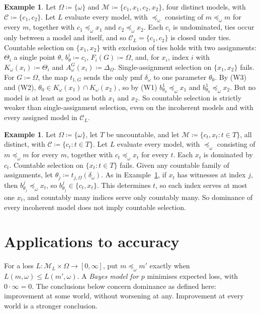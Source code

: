\documentclass[11pt]{article}
\theoremstyle{definition}
\newtheorem{example}[theorem]{Example}
\theoremstyle{remark}
\newcommand{\M}{\mathcal M}
\newcommand{\C}{\mathcal C}
\begin{document}
\begin{example}\label{ex:two-pairs}
Let $\Omega\coloneqq\{\omega\}$ and $\M\coloneqq\{c_1,x_1,c_2,x_2\}$, four distinct models, with $\C\coloneqq\{c_1,c_2\}$. Let $L$ evaluate every model, with $\preceq_\omega$ consisting of $m\preceq_\omega m$ for every $m$, together with $c_1\preceq_\omega x_1$ and $c_2\preceq_\omega x_2$. Each $c_i$ is undominated, ties occur only between a model and itself, and so $\C_L=\{c_1,c_2\}$ is closed under ties. Countable selection on $\{x_1,x_2\}$ with exclusion of ties holds with two assignments: $\Theta_i$ a single point $\theta$, $b^i_\theta\coloneqq c_i$, $F_i(G)\coloneqq\Omega$, and, for $x_i$, index $i$ with $K_\omega(x_i)\coloneqq\Theta_i$ and $A^G_\omega(x_i)\coloneqq\Delta_\Omega$. Single-assignment selection on $\{x_1,x_2\}$ fails. For $G\coloneqq\Omega$, the map $t_{1,G}$ sends the only pmf $\delta_\omega$ to one parameter $\theta_0$. By (W3) and (W2), $\theta_0\in K_\omega(x_1)\cap K_\omega(x_2)$, so by (W1) $b^1_{\theta_0}\preceq_\omega x_1$ and $b^1_{\theta_0}\preceq_\omega x_2$. But no model is at least as good as both $x_1$ and $x_2$. So countable selection is strictly weaker than single-assignment selection, even on the incoherent models and with every assigned model in $\C_L$.
\end{example}

\begin{example}\label{ex:uncountable}
Let $\Omega\coloneqq\{\omega\}$, let $T$ be uncountable, and let $\M\coloneqq\{c_t,x_t:t\in T\}$, all distinct, with $\C\coloneqq\{c_t:t\in T\}$. Let $L$ evaluate every model, with $\preceq_\omega$ consisting of $m\preceq_\omega m$ for every $m$, together with $c_t\preceq_\omega x_t$ for every $t$. Each $x_t$ is dominated by $c_t$. Countable selection on $\{x_t:t\in T\}$ fails. Given any countable family of assignments, let $\theta_j\coloneqq t_{j,\Omega}(\delta_\omega)$. As in Example~\ref{ex:two-pairs}, if $x_t$ has witnesses at index $j$, then $b^j_{\theta_j}\preceq_\omega x_t$, so $b^j_{\theta_j}\in\{c_t,x_t\}$. This determines $t$, so each index serves at most one $x_t$, and countably many indices serve only countably many. So dominance of every incoherent model does not imply countable selection.
\end{example}



\section{Applications to accuracy}\label{sec:short-applications}
For a loss $L:\M_L\times\Omega\to[0,\infty]$, put $m\preceq_\omega m'$ exactly when $L(m,\omega)\le L(m',\omega)$. A \emph{Bayes model for $p$} minimises expected loss, with $0\cdot\infty=0$. The conclusions below concern dominance as defined here: improvement at some world, without worsening at any. Improvement at every world is a stronger conclusion.
\end{document}
